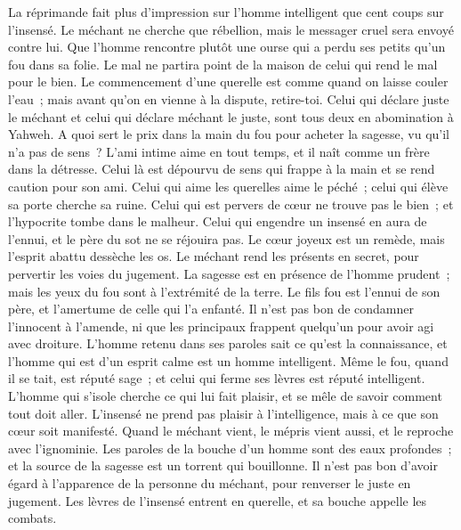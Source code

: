 \begin{multicols}{2}
La réprimande fait plus d'impression sur l'homme intelligent que cent coups sur l'insensé.
Le méchant ne cherche que rébellion, mais le messager cruel sera envoyé contre lui.
Que l'homme rencontre plutôt une ourse qui a perdu ses petits qu'un fou dans sa folie.
Le mal ne partira point de la maison de celui qui rend le mal pour le bien.
Le commencement d'une querelle est comme quand on laisse couler l'eau~; mais avant qu'on en vienne à la dispute, retire-toi.
Celui qui déclare juste le méchant et celui qui déclare méchant le juste, sont tous deux en abomination à Yahweh.
A quoi sert le prix dans la main du fou pour acheter la sagesse, vu qu'il n'a pas de sens~?
L'ami intime aime en tout temps, et il naît comme un frère dans la détresse.
Celui là est dépourvu de sens qui frappe à la main et se rend caution pour son ami.
Celui qui aime les querelles aime le péché~; celui qui élève sa porte cherche sa ruine.
Celui qui est pervers de cœur ne trouve pas le bien~; et l'hypocrite tombe dans le malheur.
Celui qui engendre un insensé en aura de l'ennui, et le père du sot ne se réjouira pas.
Le cœur joyeux est un remède, mais l'esprit abattu dessèche les os.
Le méchant rend les présents en secret, pour pervertir les voies du jugement.
La sagesse est en présence de l'homme prudent~; mais les yeux du fou sont à l'extrémité de la terre.
Le fils fou est l'ennui de son père, et l'amertume de celle qui l'a enfanté.
Il n'est pas bon de condamner l'innocent à l'amende, ni que les principaux frappent quelqu'un pour avoir agi avec droiture.
L'homme retenu dans ses paroles sait ce qu'est la connaissance, et l'homme qui est d'un esprit calme est un homme intelligent.
Même le fou, quand il se tait, est réputé sage~; et celui qui ferme ses lèvres est réputé intelligent.
\VerseOne{}L'homme qui s'isole cherche ce qui lui fait plaisir, et se mêle de savoir comment tout doit aller.
L'insensé ne prend pas plaisir à l'intelligence, mais à ce que son cœur soit manifesté.
Quand le méchant vient, le mépris vient aussi, et le reproche avec l'ignominie.
Les paroles de la bouche d'un homme sont des eaux profondes~; et la source de la sagesse est un torrent qui bouillonne.
Il n'est pas bon d'avoir égard à l'apparence de la personne du méchant, pour renverser le juste en jugement.
Les lèvres de l'insensé entrent en querelle, et sa bouche appelle les combats.

\end{multicols}
